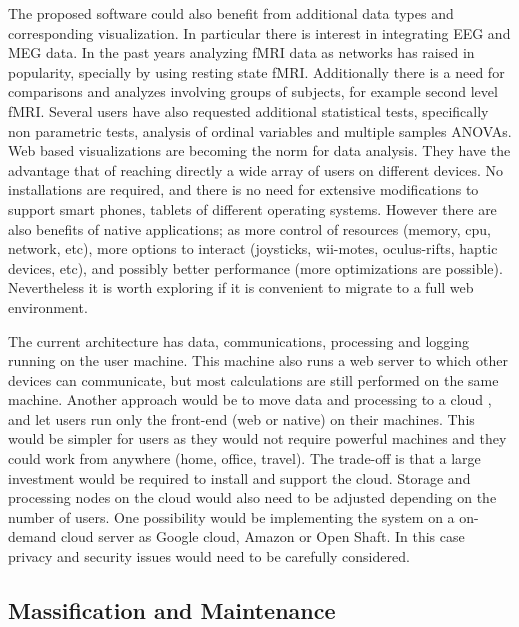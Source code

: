 The proposed software could also benefit from additional data types and corresponding visualization. In particular there is interest in integrating EEG and MEG data. In the past years analyzing fMRI data as networks has raised in popularity, specially by using resting state fMRI. Additionally there is a need for comparisons and analyzes involving groups of subjects, for example second level fMRI. Several users have also requested additional statistical tests, specifically non parametric tests, analysis of ordinal variables and multiple samples ANOVAs.  
Web based visualizations are becoming the norm for data analysis. They have the advantage that of reaching directly a wide array of users on different devices. No installations are required, and there is no need for extensive modifications to support smart phones, tablets of different operating systems. However there are also benefits of native applications; as more control of resources (memory, cpu, network, etc), more options to interact (joysticks, wii-motes, oculus-rifts, haptic devices, etc), and possibly better performance (more optimizations are possible). Nevertheless it is worth exploring if it is convenient to migrate to a full web environment.

The current architecture has data, communications, processing and logging running on the user machine. This machine also runs a web server to  which other devices can communicate, but most calculations are still performed on the same machine. Another approach would be to move data and processing to a cloud , and let users run only the front-end (web or native) on their machines. This would be simpler for users as they would not require powerful machines and they could work from anywhere (home, office, travel). The trade-off is that a large investment would be required  to install and support the cloud. Storage and processing nodes on the cloud would also need to be adjusted depending on the number of users. One possibility would be implementing the system on a on-demand cloud server as Google cloud, Amazon or Open Shaft. In this case privacy and security issues would need to be carefully considered. 


\subsection{Massification and Maintenance}

